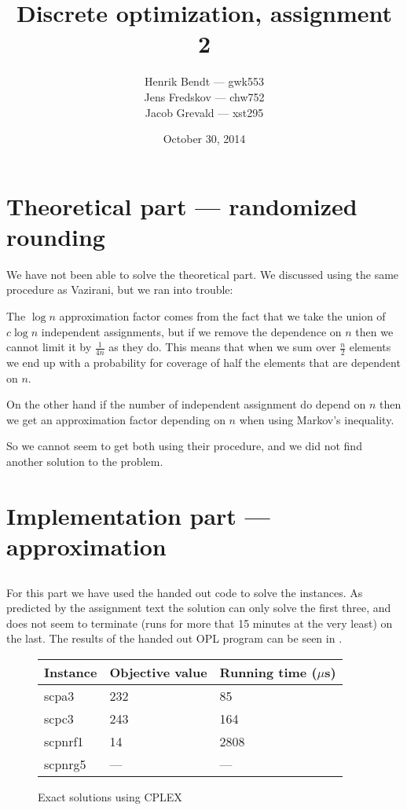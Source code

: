 \documentclass[11pt]{article}
\title{Discrete optimization, assignment 2}
\author{
    Henrik Bendt --- gwk553 \\
    Jens Fredskov --- chw752 \\
    Jacob Grevald --- xst295
}
\date{October 30, 2014}
\begin{document}
\maketitle

\section*{Theoretical part --- randomized rounding}

We have not been able to solve the theoretical part. We discussed using the same
procedure as Vazirani, but we ran into trouble:

The $\log n$ approximation factor comes from the fact that we take the
union of $c \log n$ independent assignments, but if we remove the
dependence on $n$ then we cannot limit it by $\frac{1}{4n}$ as they do.
This means that when we sum over $\frac{n}{2}$ elements we end up with
a probability for coverage of half the elements that are dependent on
$n$.

On the other hand if the number of independent assignment do depend on $n$ then
we get an approximation factor depending on $n$ when using Markov's inequality.

So we cannot seem to get both using their procedure, and we did not find another
solution to the problem.

\section*{Implementation part --- approximation}

\subsection{}
For this part we have used the handed out code to solve the instances. As
predicted by the assignment text the solution can only solve the first three,
and does not seem to terminate (runs for more that 15 minutes
at the very least) on the last. The results of the handed out OPL program can be
seen in .

\begin{figure}[H]
    \centering
    \begin{tabular}{lll}
        \toprule
        Instance & Objective value & Running time ($\mu$s) \\
        \midrule
        scpa3       & 232     & 85    \\
        scpc3       & 243     & 164   \\
        scpnrf1     & 14      & 2808  \\
        scpnrg5     & ---     & ---   \\
        \bottomrule
    \end{tabular}
    \caption{Exact solutions using CPLEX}\label{fig:opl-results}
\end{figure}
\end{document}
